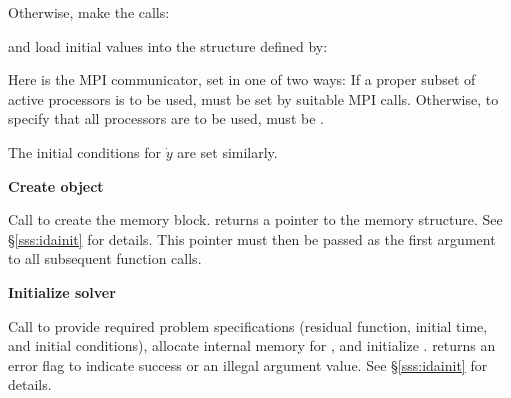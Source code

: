 \begin{Steps}
  {\s} 

  {\omp} 

  {\pt} 

  {\p} 

  Otherwise, make the calls:

  {\s} 

  {\omp} 

  {\pt} 

  {\p} 

  and load initial values into the structure defined by:

  {\s} 

  {\omp} 

  {\pt} 

  {\p} 

  Here  is the MPI communicator, set in one of two ways: 
  If a proper subset of active processors is to be used,  
  must be set by suitable MPI calls. Otherwise, to specify that all 
  processors are to be used,  must be .
  
  The initial conditions for $\dot{y}$ are set similarly.

\item\label{i:ida_create} 
  {\bf Create {\ida} object}

  Call \id{()} 
  to create the {\ida} memory block.
   returns a pointer to the {\ida} memory structure.
  See \S\ref{sss:idainit} for details.
  This  pointer must then be passed as the first argument
  to all subsequent {\ida} function calls.

\item\label{i:ida_init} 
  {\bf Initialize {\ida} solver}

  Call  to provide required problem
  specifications (residual function, initial time, and initial conditions),
  allocate internal memory for {\ida}, and initialize {\ida}.
   returns an error flag to indicate success or an illegal argument
  value.  See \S\ref{sss:idainit} for details.
  

\end{Steps}
